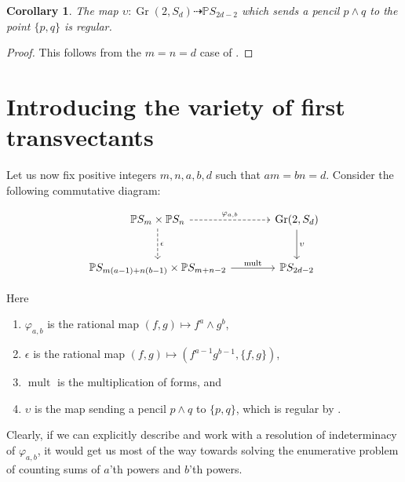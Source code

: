 \documentclass[reqno, 11pt]{amsart}
\theoremstyle{plain}
\newtheorem{corollary}[theorem]{Corollary}
\theoremstyle{remark}
\renewcommand{\P}{\mathbb{P}}
\DeclareMathOperator{\Gr}{Gr}
\DeclareMathOperator{\mult}{mult}
\begin{document}
\begin{corollary}
    \label{corollary:wronskiregular}
    The map $\upsilon: \Gr(2,S_{d}) \dashrightarrow \P S_{2d-2}$ which sends a pencil $p \wedge q$ to the point $\{p,q\}$ is regular. 
\end{corollary}

\begin{proof}
    This follows from the $m = n = d$ case of . 
\end{proof}

\section{Introducing the variety of first transvectants} 
\label{section:main}


Let us now fix positive integers $m, n, a, b, d$ such that $a m = b n = d$.  Consider the following commutative diagram:

\begin{center}
    \begin{equation}\label{diagram:clebsch}
\begin{tikzcd}[row sep=large, column sep=large]
    \P S_{m} \times \P S_{n} \arrow[r, "\varphi_{a,b}", dashed] \arrow[d,"\epsilon", dashed] & \Gr(2,S_{d}) \arrow[d, "{\upsilon}"]\\
    \P S_{m(a-1) + n(b-1)} \times \P S_{m+n-2} \arrow[r, "\mult"] & \P S_{2d-2}
\end{tikzcd}
    \end{equation}
\end{center}

Here
\begin{enumerate}
    \item $\varphi_{a,b}$ is the rational map $(f,g) \mapsto f^a \wedge g^b$, 
    \item $\epsilon$ is the rational map $(f,g) \mapsto (f^{a-1}g^{b-1},\{f,g\})$,
    \item $\mult$ is the multiplication of forms, and
    \item $\upsilon$ is the map sending a pencil $p \wedge q$ to $\{p,q\}$, which is regular by .
\end{enumerate}

Clearly, if we can explicitly describe and work with a resolution of indeterminacy of $\varphi_{a,b}$, it would get us most of the way towards solving the enumerative problem of counting sums of $a$'th powers and $b$'th powers.  
\end{document}

